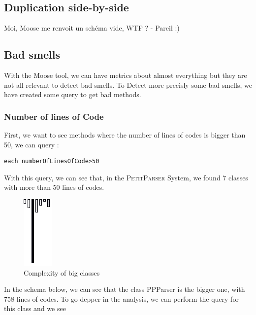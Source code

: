 \subsection{Duplication side-by-side}
Moi, Moose me renvoit un schéma vide, WTF ? - Pareil :)

\subsection{Bad smells}
With the Moose tool, we can have metrics about almost everything but they are not all relevant to detect bad smells.  To Detect more precisly some bad smells, we have created some query to get bad methods.\\

\subsubsection{Number of lines of Code}
First, we want to see methods where the number of lines of codes is bigger than 50, we can query :
\begin{lstlisting}
each numberOfLinesOfCode>50
\end{lstlisting}
With this query, we can see that, in the \textsc{PetitParser} System, we found 7 classes with more than 50 lines of codes.\\

\begin{figure}[ht]
\centering
\label{system_complexity_big_classes}
\includegraphics[scale=0.55]{system_complexity_big_methods.png}
\caption{Complexity of big classes}
\end{figure}
In the schema below, we can see that the class PPParser is the bigger one, with 758 lines of codes.  To go depper in the analysis, we can perform the query for this class and we see \\
